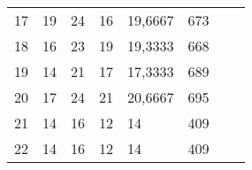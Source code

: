 \begin{anexosenv}
\begin{table}[hbtp!]
\begin{tabular}{|l|l|l|l|l|l|l|l|}
17 & 19  & 24  & 16  & 19,6667     & 673  &                  &                        \\
18 & 16  & 23  & 19  & 19,3333     & 668  &                  &                        \\
19 & 14  & 21  & 17  & 17,3333     & 689  &                  &                        \\
20 & 17  & 24  & 21  & 20,6667     & 695  &                  &                        \\
21 & 14  & 16  & 12  & 14          & 409  &                  &                        \\
22 & 14  & 16  & 12  & 14          & 409  &                  &                       \\\hline
\end{tabular}
\end{table}



\end{anexosenv}
